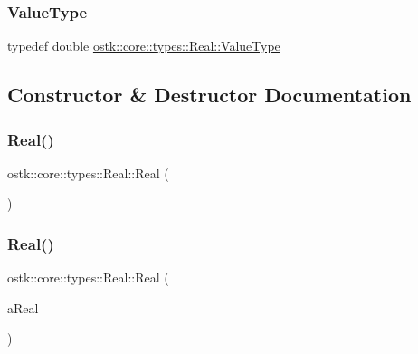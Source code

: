 \subsubsection{\texorpdfstring{Value\+Type}{ValueType}}
{\footnotesize\ttfamily typedef double \hyperlink{classostk_1_1core_1_1types_1_1_real_aa26f796c30b514c98d573f82e3b02296}{ostk\+::core\+::types\+::\+Real\+::\+Value\+Type}}



\subsection{Constructor \& Destructor Documentation}
\mbox{\label{classostk_1_1core_1_1types_1_1_real_a8db556f60f91a627582e3074affc6c2a}} 
\subsubsection{\texorpdfstring{Real()}{Real()}\hspace{0.1cm}{\footnotesize\ttfamily [1/2]}}
{\footnotesize\ttfamily ostk\+::core\+::types\+::\+Real\+::\+Real (\begin{DoxyParamCaption}{ }\end{DoxyParamCaption})\hspace{0.3cm}{\ttfamily [delete]}}

\mbox{\label{classostk_1_1core_1_1types_1_1_real_af6098f61e46665374d3a95680c74f0a0}} 
\subsubsection{\texorpdfstring{Real()}{Real()}\hspace{0.1cm}{\footnotesize\ttfamily [2/2]}}
{\footnotesize\ttfamily ostk\+::core\+::types\+::\+Real\+::\+Real (\begin{DoxyParamCaption}\item[{\hyperlink{classostk_1_1core_1_1types_1_1_real_aa26f796c30b514c98d573f82e3b02296}{Real\+::\+Value\+Type}}]{a\+Real }\end{DoxyParamCaption})}



